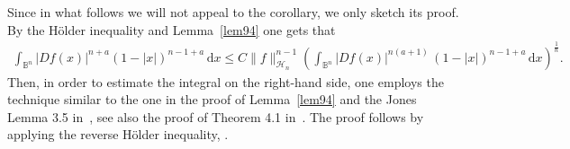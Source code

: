 \documentclass[11pt,a4paper,reqno]{amsart}
\theoremstyle{definition}
\newcommand{\B}{\mathbb{B}^n}
\newcommand{\ud}{\mathrm {d}}
\numberwithin{komcounter}{section}
\begin{document}
Since in what follows we will not appeal to the corollary, we only sketch its proof. By the H\"older inequality and Lemma~\ref{lem94} one gets that
\begin{align*}
  \int_{\B}|Df(x)|^{n+a}(1-|x|)^{n-1+a}\,\ud x 
 \leq  C \|f\|_{\mathcal{H}_n}^{n-1} \left(\int_{\B}|Df(x)|^{n(a+1)}\,(1-|x|)^{n-1+a}\,\ud x \right)^{\frac1n}.
 \end{align*}
Then, in order to estimate the integral on the right-hand side, one employs the technique similar to the one in the proof of Lemma~\ref{lem94} and the Jones Lemma 3.5 in~\cite{ag2}, see also the proof of Theorem 4.1 in~\cite{kmv}. The proof follows by applying the reverse H\"older inequality, \cite[Theorem 5.1]{bi}.
\end{document}
